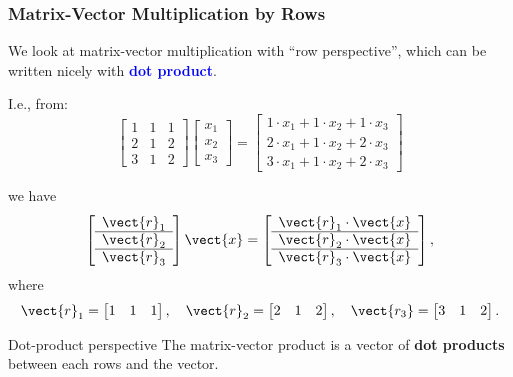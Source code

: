 \begin{frame}
  \frametitle{Matrix-Vector Multiplication {\bf by Rows}}

  We look at matrix-vector multiplication with ``row perspective'',
  which can be written nicely with \textcolor{blue}{\bf dot product}.

  I.e., from:
  \[
  \begin{bmatrix}
    1 & 1 & 1 \\
    2 & 1 & 2 \\
    3 & 1 & 2
  \end{bmatrix}
  \begin{bmatrix}
    x_1\\
    x_2\\
    x_3
  \end{bmatrix}
  =
  \begin{bmatrix}
    1\cdot x_1 + 1\cdot x_2 + 1\cdot x_3 \\
    2\cdot x_1 + 1\cdot x_2 + 2\cdot x_3 \\
    3\cdot x_1 + 1\cdot x_2 + 2\cdot x_3
  \end{bmatrix}
  \]

  we have
  \[
  \left[
    \begin{array}{c}
      \vect{r}_1 \\
      \hline
      \vect{r}_2 \\
      \hline
      \vect{r}_3 
    \end{array}
    \right]
  \vect{x}
  =
  \left[
    \begin{array}{c}
      \vect{r}_1\cdot\vect{x} \\
      \hline
      \vect{r}_2\cdot\vect{x} \\
      \hline
      \vect{r}_3\cdot\vect{x}
    \end{array}
    \right],
  \]
  where
  \[
  \vect{r}_1=
  \begin{bmatrix}
    1 & 1 & 1
  \end{bmatrix},
  \ \ \
  \vect{r}_2=
  \begin{bmatrix}
    2 & 1 & 2
  \end{bmatrix},
  \ \ \
  \vect{r_3}=
  \begin{bmatrix}
    3 & 1 & 2
  \end{bmatrix}.
  \]

  \pause
  \begin{block}{Dot-product perspective}
    The matrix-vector product is a vector of {\bf dot products}
    between each rows and the vector.
  \end{block}
\end{frame}
  
